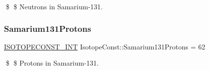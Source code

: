 \$ \$ Neutrons in Samarium-\/131. \mbox{\label{group___isotope_const-_samarium-_sm131_ga77935bad885bb336cda28b7a64d50680}} 
\subsubsection{\texorpdfstring{Samarium131\+Protons}{Samarium131Protons}}
{\footnotesize\ttfamily \mbox{\hyperlink{group___isotope_const-_macros_ga5f18360b3e99483a35c32d789e62621c}{I\+S\+O\+T\+O\+P\+E\+C\+O\+N\+S\+T\+\_\+\+I\+NT}} Isotope\+Const\+::\+Samarium131\+Protons = 62}

\$ \$ Protons in Samarium-\/131. 